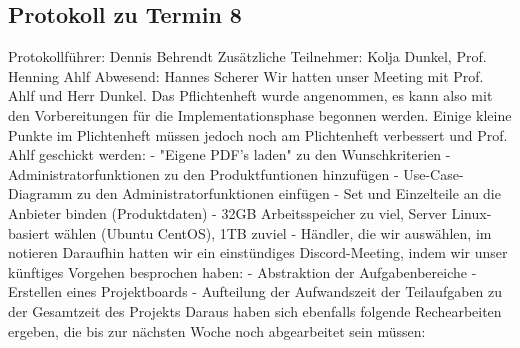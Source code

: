 \subsection{Protokoll zu Termin 8}
Protokollführer: Dennis Behrendt \newline
Zusätzliche Teilnehmer: Kolja Dunkel, Prof. Henning Ahlf \newline
Abwesend: Hannes Scherer \newline \newline
Wir hatten unser Meeting mit Prof. Ahlf und Herr Dunkel. Das Pflichtenheft wurde angenommen, es kann also mit den Vorbereitungen für die Implementationsphase begonnen werden. \newline
Einige kleine Punkte im Plichtenheft müssen jedoch noch am Plichtenheft verbessert und Prof. Ahlf geschickt werden: \newline
  - "Eigene PDF's laden" zu den Wunschkriterien \newline
  - Administratorfunktionen zu den Produktfuntionen hinzufügen \newline
  - Use-Case-Diagramm zu den Administratorfunktionen einfügen \newline
  - Set und Einzelteile an die Anbieter binden (Produktdaten) \newline
  - 32GB Arbeitsspeicher zu viel, Server Linux-basiert wählen (Ubuntu CentOS), 1TB zuviel \newline
  - Händler, die wir auswählen, im notieren \newline
Daraufhin hatten wir ein einstündiges Discord-Meeting, indem wir unser künftiges Vorgehen besprochen haben: \newline
  - Abstraktion der Aufgabenbereiche \newline
  - Erstellen eines Projektboards \newline
  - Aufteilung der Aufwandszeit der Teilaufgaben zu der Gesamtzeit des Projekts \newline
Daraus haben sich ebenfalls folgende Rechearbeiten ergeben, die bis zur nächsten Woche noch abgearbeitet sein müssen:
